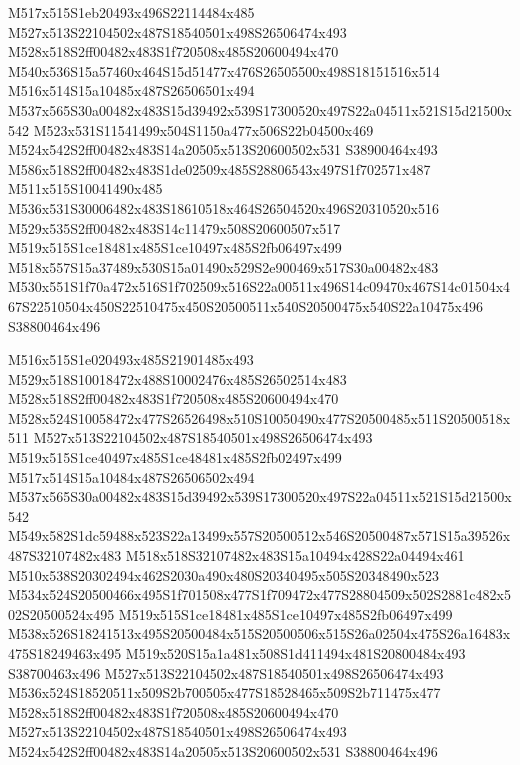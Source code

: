 \documentclass{article}
\begin{document}
\begin{multicols}{2}
M517x515S1eb20493x496S22114484x485 M527x513S22104502x487S18540501x498S26506474x493 M528x518S2ff00482x483S1f720508x485S20600494x470 M540x536S15a57460x464S15d51477x476S26505500x498S18151516x514 M516x514S15a10485x487S26506501x494 M537x565S30a00482x483S15d39492x539S17300520x497S22a04511x521S15d21500x542 M523x531S11541499x504S1150a477x506S22b04500x469 M524x542S2ff00482x483S14a20505x513S20600502x531 S38900464x493 M586x518S2ff00482x483S1de02509x485S28806543x497S1f702571x487 M511x515S10041490x485 M536x531S30006482x483S18610518x464S26504520x496S20310520x516 M529x535S2ff00482x483S14c11479x508S20600507x517 M519x515S1ce18481x485S1ce10497x485S2fb06497x499 M518x557S15a37489x530S15a01490x529S2e900469x517S30a00482x483 M530x551S1f70a472x516S1f702509x516S22a00511x496S14c09470x467S14c01504x467S22510504x450S22510475x450S20500511x540S20500475x540S22a10475x496 S38800464x496

M516x515S1e020493x485S21901485x493 M529x518S10018472x488S10002476x485S26502514x483 M528x518S2ff00482x483S1f720508x485S20600494x470 M528x524S10058472x477S26526498x510S10050490x477S20500485x511S20500518x511 M527x513S22104502x487S18540501x498S26506474x493 M519x515S1ce40497x485S1ce48481x485S2fb02497x499 M517x514S15a10484x487S26506502x494 M537x565S30a00482x483S15d39492x539S17300520x497S22a04511x521S15d21500x542 M549x582S1dc59488x523S22a13499x557S20500512x546S20500487x571S15a39526x487S32107482x483 M518x518S32107482x483S15a10494x428S22a04494x461 M510x538S20302494x462S2030a490x480S20340495x505S20348490x523 M534x524S20500466x495S1f701508x477S1f709472x477S28804509x502S2881c482x502S20500524x495 M519x515S1ce18481x485S1ce10497x485S2fb06497x499 M538x526S18241513x495S20500484x515S20500506x515S26a02504x475S26a16483x475S18249463x495 M519x520S15a1a481x508S1d411494x481S20800484x493 S38700463x496 M527x513S22104502x487S18540501x498S26506474x493 M536x524S18520511x509S2b700505x477S18528465x509S2b711475x477 M528x518S2ff00482x483S1f720508x485S20600494x470 M527x513S22104502x487S18540501x498S26506474x493 M524x542S2ff00482x483S14a20505x513S20600502x531 S38800464x496


\end{multicols}
\end{document}
